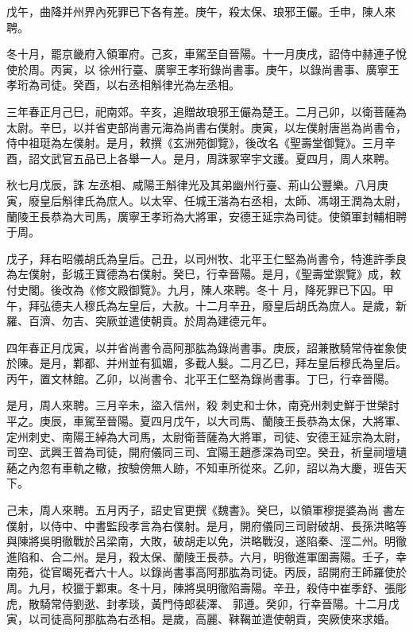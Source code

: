 \begin{pinyinscope}
 戊午，曲降并州界內死罪已下各有差。庚午，殺太保、琅邪王儼。壬申，陳人來聘。



 冬十月，罷京畿府入領軍府。己亥，車駕至自晉陽。十一月庚戌，詔侍中赫連子悅使於周。丙寅，以
 徐州行臺、廣寧王孝珩錄尚書事。庚午，以錄尚書事、廣寧王孝珩為司徒。癸酉，以右丞相斛律光為左丞相。



 三年春正月己巳，祀南郊。辛亥，追贈故琅邪王儼為楚王。二月己卯，以衛菩薩為太尉。辛巳，以并省吏部尚書元海為尚書右僕射。庚寅，以左僕射唐邕為尚書令，侍中祖珽為左僕射。是月，敕撰《玄洲苑御覽》，後改名《聖壽堂御覽》。三月辛酉，詔文武官五品已上各舉一人。是月，周誅冢宰宇文護。夏四月，周人來聘。



 秋七月戊辰，誅
 左丞相、咸陽王斛律光及其弟幽州行臺、荊山公豐樂。八月庚寅，廢皇后斛律氏為庶人。以太宰、任城王湝為右丞相，太師、馮翊王潤為太尉，蘭陵王長恭為大司馬，廣寧王孝珩為大將軍，安德王延宗為司徒。使領軍封輔相聘于周。



 戊子，拜右昭儀胡氏為皇后。己丑，以司州牧、北平王仁堅為尚書令，特進許季良為左僕射，彭城王寶德為右僕射。癸巳，行幸晉陽。是月，《聖壽堂禦覽》成，敕付史閣。後改為《修文殿御覽》。九月，陳人來聘。冬十
 月，降死罪已下囚。甲午，拜弘德夫人穆氏為左皇后，大赦。十二月辛丑，廢皇后胡氏為庶人。是歲，新羅、百濟、勿吉、突厥並遣使朝貢。於周為建德元年。



 四年春正月戊寅，以并省尚書令高阿那肱為錄尚書事。庚辰，詔兼散騎常侍崔象使於陳。是月，鄴都、并州並有狐媚，多截人髮。二月乙巳，拜左皇后穆氏為皇后。丙午，置文林館。乙卯，以尚書令、北平王仁堅為錄尚書事。丁巳，行幸晉陽。



 是月，周人來聘。三月辛未，盜入信州，殺
 刺史和士休，南兗州刺史鮮于世榮討平之。庚辰，車駕至晉陽。夏四月戊午，以大司馬、蘭陵王長恭為太保，大將軍、定州刺史、南陽王綽為大司馬，太尉衛菩薩為大將軍，司徒、安德王延宗為太尉，司空、武興王普為司徒，開府儀同三司、宜陽王趙彥深為司空。癸丑，祈皇祠壇壝蕝之內忽有車軌之轍，按驗傍無人跡，不知車所從來。乙卯，詔以為大慶，班告天下。



 己未，周人來聘。五月丙子，詔史官更撰《魏書》。癸巳，以領軍穆提婆為尚
 書左僕射，以侍中、中書監段孝言為右僕射。是月，開府儀同三司尉破胡、長孫洪略等與陳將吳明徹戰於呂梁南，大敗，破胡走以免，洪略戰沒，遂陷秦、涇二州。明徹進陷和、合二州。是月，殺太保、蘭陵王長恭。六月，明徹進軍圍壽陽。壬子，幸南苑，從官暍死者六十人。以錄尚書事高阿那肱為司徒。丙辰，詔開府王師羅使於周。九月，校獵于鄴東。冬十月，陳將吳明徹陷壽陽。辛丑，殺侍中崔季舒、張彫虎，散騎常侍劉逖、封孝琰，黃門侍郎裴澤、
 郭遵。癸卯，行幸晉陽。十二月戊寅，以司徒高阿那肱為右丞相。是歲，高麗、靺鞨並遣使朝貢，突厥使來求婚。




\end{pinyinscope}
